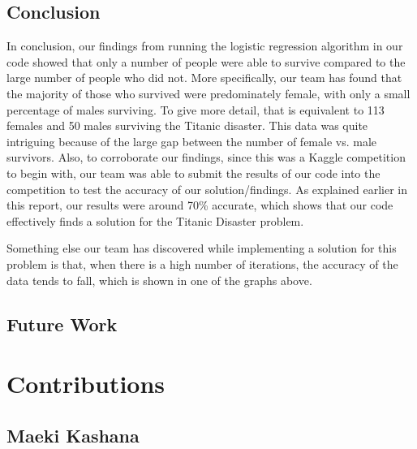 \documentclass{IEEE}
\begin{document}
\subsection{Conclusion}
In conclusion, our findings from running the logistic regression algorithm in our code showed that only a number of people were able to survive compared to the large number of people who did not. More specifically, our team has found that the majority of those who survived were predominately female, with only a small percentage of males surviving. To give more detail, that is equivalent to 113 females and 50 males surviving the Titanic disaster.  This data was quite intriguing because of the large gap between the number of female vs. male survivors. Also, to corroborate our findings, since this was a Kaggle competition to begin with, our team was able to submit the results of our code into the competition to test the accuracy of our solution/findings. As explained earlier in this report, our results were around 70\% accurate, which shows that our code effectively finds a solution for the Titanic Disaster problem.

Something else our team has discovered while implementing a solution for this problem is that, when there is a high number of iterations, the accuracy of the data tends to fall, which is shown in one of the graphs above.
\subsection{Future Work}





\section{Contributions}

\subsection{Maeki Kashana}
\end{document}
